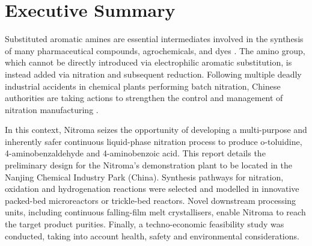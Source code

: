 \section*{Executive Summary}
\label{sec:exec-summary}

Substituted aromatic amines are essential intermediates involved in the synthesis of many pharmaceutical compounds, agrochemicals, and dyes \cite{vogt_amines_2000}. The amino group, which cannot be directly introduced via electrophilic aromatic substitution, is instead added via nitration and subsequent reduction. Following multiple deadly industrial accidents in chemical plants performing batch nitration, Chinese authorities are taking actions to strengthen the control and management of nitration manufacturing \cite{el_diario_china_2019}.

In this context, Nitroma seizes the opportunity of developing a multi-purpose and inherently safer continuous liquid-phase nitration process to produce o-toluidine, 4-aminobenzaldehyde and 4-aminobenzoic acid. This report details the preliminary design for the Nitroma’s demonstration plant to be located in the Nanjing Chemical Industry Park (China). Synthesis pathways for nitration, oxidation and hydrogenation reactions were selected and modelled in innovative packed-bed microreactors or trickle-bed reactors. Novel downstream processing units, including continuous falling-film melt crystallisers, enable Nitroma to reach the target product purities. Finally, a techno-economic feasibility study was conducted, taking into account health, safety and environmental considerations.
